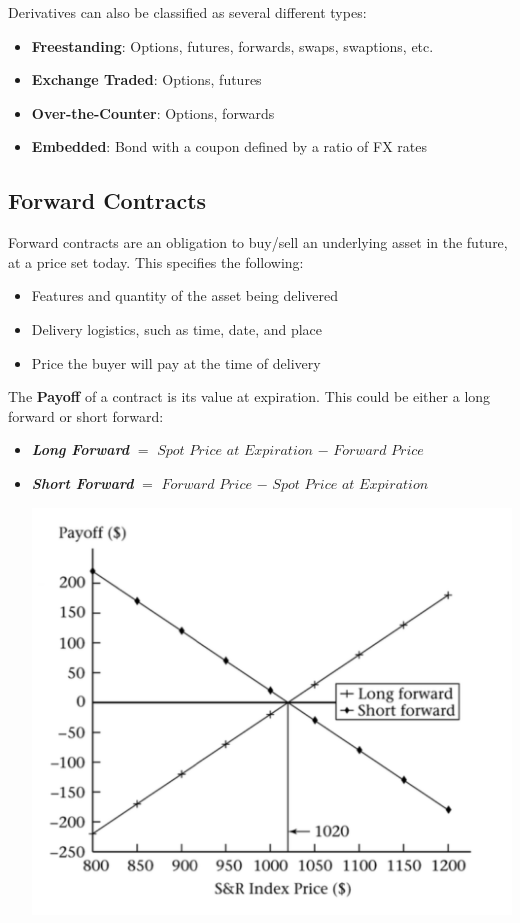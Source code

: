 \documentclass[11pt]{article}
\begin{document}
Derivatives can also be classified as several different types:
\begin{itemize}
\item \textbf{Freestanding}: Options, futures, forwards, swaps, swaptions, etc.
\item \textbf{Exchange Traded}: Options, futures
\item \textbf{Over-the-Counter}: Options, forwards
\item \textbf{Embedded}: Bond with a coupon defined by a ratio of FX rates
\end{itemize}


\subsection{Forward Contracts}
Forward contracts are an obligation to buy/sell an underlying asset in the future, at a price set today. This specifies the following:
\begin{itemize}
\item Features and quantity of the asset being delivered
\item Delivery logistics,  such as time, date, and place
\item Price the buyer will pay at the time of delivery
\end{itemize}
\pagebreak
The \textbf{Payoff} of a contract is its value at expiration. This could be either a long forward or short forward:
\begin{itemize}
\item \textbf{\textit{Long Forward}} $=$ $Spot$ $Price$ $at$ $Expiration$ $-$ $Forward$ $Price$
\item \textbf{\textit{Short Forward}} $=$ $Forward$ $Price$ $-$ $Spot$ $Price$ $at$ $Expiration$ 
\begin{center}
\includegraphics[scale=0.4]{images/forwards.png} 
\end{center}
\end{itemize}
\end{document}
